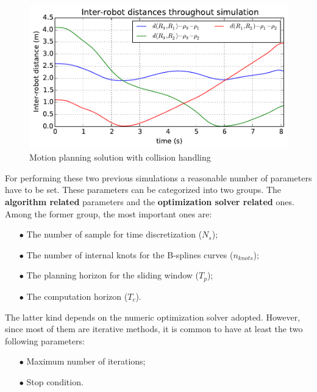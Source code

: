 \documentclass[eprint]{actapoly}
\begin{document}
\begin{figure}
  \includegraphics[width=\linewidth]{./images/no_collision/multirobot-interr2.pdf} %
  \caption{Motion planning solution with collision handling\label{fig:nocollision}}
\label{fig:res}
\end{figure}

For performing these two previous simulations a reasonable number of parameters have to be set. These parameters can be categorized into two groups. The \textbf{algorithm related} parameters and the \textbf{optimization solver related} ones.
Among the former group, the most important ones are:
\begin{itemize}
\item[$\bullet$] The number of sample for time discretization ($N_s$);
\item[$\bullet$] The number of internal knots for the B-splines curves ($n_{knots}$);
\item[$\bullet$] The planning horizon for the sliding window ($T_p$);
\item[$\bullet$] The computation horizon ($T_c$).
\end{itemize}

The latter kind depends on the numeric optimization solver adopted.
However, since most of them are iterative methods, it is common
to have at least the two following parameters:
\begin{itemize}
\item[$\bullet$] Maximum number of iterations;
\item[$\bullet$] Stop condition.
\end{itemize}

\end{document}

